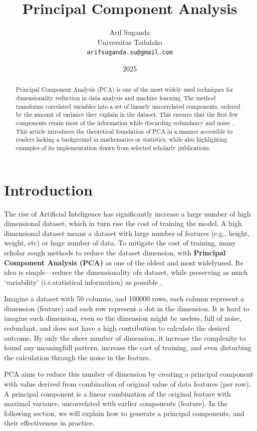 \documentclass[a4paper,12pt]{article}
\title{Principal Component Analysis}
\author{Arif Suganda\\Universitas Tadulako\\ \texttt{arifsuganda.su@gmail.com}}
\date{2025}
\begin{document}
\maketitle

\begin{abstract}
Principal Component Analysis (PCA) is one of the most widely used techniques for dimensionality reduction in data analysis and machine learning.
The method transforms correlated variables into a set of linearly uncorrelated components, ordered by the amount of variance they explain in the dataset.
This ensures that the first few components retain most of the information while discarding redundancy and noise \cite{jolliffe2016principal}. 
This article introduces the theoretical foundation of PCA in a manner accessible to readers lacking a background in mathematics or statistics, 
while also highlighting examples of its implementation drawn from selected scholarly publications.
\end{abstract}

\section{Introduction}
The rise of Artificial Inteligence has significantly increase a large number of high dimensional dataset, which in turn rise the cost of training the model. 
A high dimensional dataset means a dataset with large number of features (e.g., height, weight, etc) or huge number of data. 
To mitigate the cost of training, many scholar sough methods to reduce the dataset dimension, with \textbf{Principal Component Analysis (PCA)} as one of the oldest and most widelyused.
Its idea is simple—reduce the dimensionality ofa dataset, while preserving as much ‘variability’ (i.e.statistical information) as possible \cite{jolliffe2016principal}.

Imagine a dataset with 50 columns, and 100000 rows, each column represent a dimension (feature) and each row represent a dot in the dimension.
It is hard to imagine such dimension, even so the dimension might be useless, full of noise, redundant, and does not have a high contribution to calculate the desired outcome.
By only the sheer number of dimension, it increase the complexity to found any meaningfull pattern, increase the cost of training, and even disturbing the calculation through the noise in the feature.

PCA aims to reduce this number of dimension by creating a principal component with value derived from combination of original value of data features (per row).
A principal component is a linear combination of the original feature with maximal variance, uncorrelated with earlier components (feature).
In the following section, we will explain how to generate a principal components, and their effectiveness in practice.
\end{document}
